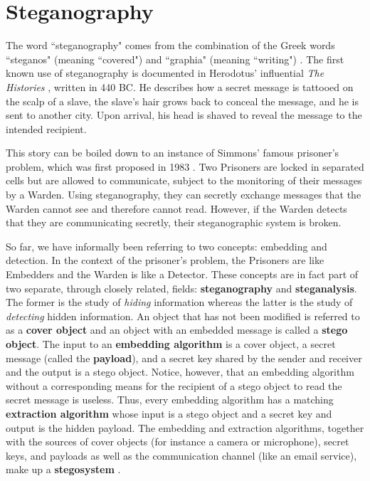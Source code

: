 \documentclass[11pt,a4paper,twoside,openright]{report}
\begin{document}
\section{Steganography}

The word ``steganography" comes from the combination of the Greek words ``steganos" (meaning ``covered") and ``graphia" (meaning ``writing") \cite{textbook}. The first known use of steganography \cite[\S 1.1]{textbook} is documented in Herodotus' influential \textit{The Histories} \cite{herodotus}, written in 440 BC. He describes how a secret message is tattooed on the scalp of a slave, the slave's hair grows back to conceal the message, and he is sent to another city. Upon arrival, his head is shaved to reveal the message to the intended recipient.

This story can be boiled down to an instance of Simmons' famous prisoner's problem, which was first proposed in 1983 \cite{prisoners-problem}. Two Prisoners are locked in separated cells but are allowed to communicate, subject to the monitoring of their messages by a Warden. Using steganography, they can secretly exchange messages that the Warden cannot see and therefore cannot read. However, if the Warden detects that they are communicating secretly, their steganographic system is broken.

So far, we have informally been referring to two concepts: embedding and detection. In the context of the prisoner's problem, the Prisoners are like Embedders and the Warden is like a Detector. These concepts are in fact part of two separate, through closely related, fields: \textbf{steganography} and \textbf{steganalysis}. The former is the study of \textit{hiding} information whereas the latter is the study of \textit{detecting} hidden information. An object that has not been modified is referred to as a \textbf{cover object} and an object with an embedded message is called a \textbf{stego object}. The input to an \textbf{embedding algorithm} is a cover object, a secret message (called the \textbf{payload}), and a secret key shared by the sender and receiver and the output is a stego object. Notice, however, that an embedding algorithm without a corresponding means for the recipient of a stego object to read the secret message is useless. Thus, every embedding algorithm has a matching \textbf{extraction algorithm} whose input is a stego object and a secret key and output is the hidden payload. The embedding and extraction algorithms, together with the sources of cover objects (for instance a camera or microphone), secret keys, and payloads as well as the communication channel (like an email service), make up a \textbf{stegosystem} \cite{ker-notes}.
\end{document}
